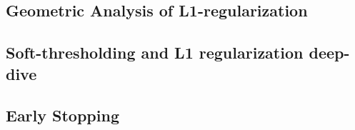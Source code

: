 \subsection{Geometric Analysis of L1-regularization}


\subsection{Soft-thresholding and L1 regularization deep-dive}


\subsection{Early Stopping}







